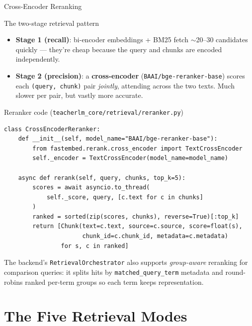 \documentclass[aspectratio=169, 10pt]{beamer}
\begin{document}
\begin{frame}{Cross-Encoder Reranking}
  \begin{block}{The two-stage retrieval pattern}
    \scriptsize
    \begin{itemize}
      \setlength\itemsep{1pt}
      \item \textbf{Stage 1 (recall)}: bi-encoder embeddings + BM25 fetch
            $\sim$20--30 candidates quickly --- they're cheap because the
            query and chunks are encoded independently.
      \item \textbf{Stage 2 (precision)}: a \textbf{cross-encoder}
            (\texttt{BAAI/bge-reranker-base}) scores each
            \texttt{(query, chunk)} pair \textit{jointly}, attending across
            the two texts. Much slower per pair, but vastly more accurate.
    \end{itemize}
  \end{block}

  \begin{exampleblock}{Reranker code (\texttt{teacherlm\_core/retrieval/reranker.py})}
    \tiny
\begin{verbatim}
class CrossEncoderReranker:
    def __init__(self, model_name="BAAI/bge-reranker-base"):
        from fastembed.rerank.cross_encoder import TextCrossEncoder
        self._encoder = TextCrossEncoder(model_name=model_name)

    async def rerank(self, query, chunks, top_k=5):
        scores = await asyncio.to_thread(
            self._score, query, [c.text for c in chunks]
        )
        ranked = sorted(zip(scores, chunks), reverse=True)[:top_k]
        return [Chunk(text=c.text, source=c.source, score=float(s),
                      chunk_id=c.chunk_id, metadata=c.metadata)
                for s, c in ranked]
\end{verbatim}
  \end{exampleblock}

  \scriptsize
  The backend's \texttt{RetrievalOrchestrator} also supports
  \textit{group-aware} reranking for comparison queries: it splits hits
  by \texttt{matched\_query\_term} metadata and round-robins ranked
  per-term groups so each term keeps representation.
\end{frame}

\section{The Five Retrieval Modes}
\end{document}
